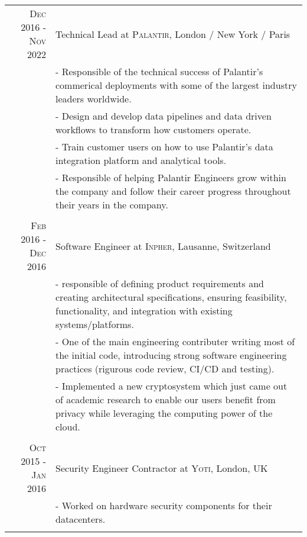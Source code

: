 \documentclass[a4paper,10pt]{article} %
\begin{document}
\begin{tabular}{r|p{11cm}}
    \textsc{Dec 2016 - Nov 2022} & Technical Lead at \textsc{Palantir}, London / New York / Paris\\
                            & \footnotesize{
                                - Responsible of the technical success of Palantir's commerical deployments with some of the largest industry leaders worldwide.
                            }\\
                            & \footnotesize{
                                - Design and develop data pipelines and data driven workflows to transform how customers operate.
                            }\\
                            & \footnotesize{
                                - Train customer users on how to use Palantir's data integration platform and analytical tools.
                            }\\
                            & \footnotesize{
                                - Responsible of helping Palantir Engineers grow within the company and follow their career progress throughout their years in the company.
                            }\\
\multicolumn{2}{c}{} \\
    \textsc{Feb 2016 - Dec 2016} & Software Engineer at \textsc{Inpher}, Lausanne, Switzerland\\
                                & \footnotesize{
                                    - responsible of defining product requirements and creating architectural specifications, ensuring feasibility, functionality, and integration with existing systems/platforms.
                                }\\
                                & \footnotesize{
                                    - One of the main engineering contributer writing most of the initial code, introducing strong software engineering practices (rigurous code review, CI/CD and testing).
                                }\\
                                & \footnotesize{
                                    - Implemented a new cryptosystem which just came out of academic research to enable our users benefit from privacy while leveraging the computing power of the cloud.
                                }\\
\multicolumn{2}{c}{} \\
    \textsc{Oct 2015 - Jan 2016} & Security Engineer Contractor at \textsc{Yoti}, London, UK\\
                              & \footnotesize{
                                  - Worked on hardware security components for their datacenters.}\\
\multicolumn{2}{c}{} \\


\end{tabular}
\end{document}
